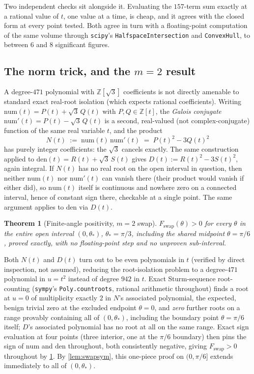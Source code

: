 \documentclass[11pt,reqno]{amsart}
\renewcommand{\_}{\origunderscore\allowbreak}
\numberwithin{equation}{section}
\theoremstyle{plain}
\newtheorem{thm}{Theorem}[section]
\theoremstyle{definition}
\theoremstyle{remark}
\begin{document}
Two independent checks sit alongside it. Evaluating the $157$-term sum
exactly at a rational value of $t$, one value at a time, is cheap, and
it agrees with the closed form at every point tested. Both agree in
turn with a floating-point computation of the same volume through
\texttt{scipy}'s \texttt{HalfspaceIntersection} and \texttt{ConvexHull},
to between $6$ and $8$ significant figures.

\subsection{The norm trick, and the \texorpdfstring{$m=2$}{m=2} result}\label{sec:swap-norm-trick}

A degree-$471$ polynomial with $\mathbb{Z}[\sqrt3]$ coefficients is not
directly amenable to standard exact real-root isolation (which expects
rational coefficients). Writing $\mathrm{num}(t)=P(t)+\sqrt3\,Q(t)$
with $P,Q\in\mathbb{Z}[t]$, the \emph{Galois conjugate}
$\mathrm{num}'(t)=P(t)-\sqrt3\,Q(t)$ is a second,
real-valued (not complex-conjugate) function of the same real variable
$t$, and the product
\[
  N(t) \;:=\; \mathrm{num}(t)\,\mathrm{num}'(t) \;=\; P(t)^2-3Q(t)^2
\]
has purely integer coefficients: the $\sqrt3$ cancels exactly. The same
construction applied to $\mathrm{den}(t)=R(t)+\sqrt3\,S(t)$ gives
$D(t):=R(t)^2-3S(t)^2$, again integral. If $N(t)$ has no real root on
the open interval in question, then neither $\mathrm{num}(t)$ nor
$\mathrm{num}'(t)$ can vanish there (their product would vanish if
either did), so $\mathrm{num}(t)$ itself is continuous and nowhere zero
on a connected interval, hence of constant sign there, checkable at a
single point. The same argument applies to $\mathrm{den}$ via $D(t)$.

\begin{thm}[Finite-angle positivity, $m=2$ swap]\label{thm:swap-m2-new}
$F_{\mathrm{swap}}(\theta)>0$ for every $\theta$ in the entire open
interval $(0,\theta_*)$, $\theta_*=\pi/3$, including the shared
midpoint $\theta=\pi/6$, proved exactly, with no floating-point step
and no unproven sub-interval.
\end{thm}

Both $N(t)$ and $D(t)$ turn out to be even polynomials in $t$ (verified
by direct inspection, not assumed), reducing the root-isolation problem
to a degree-$471$ polynomial in $u=t^2$ instead of degree $942$ in $t$. Exact Sturm-sequence root-counting (\texttt{sympy}'s
\texttt{Poly.count\_roots}, rational arithmetic throughout) finds a
root at $u=0$ of multiplicity exactly $2$ in $N$'s associated
polynomial, the expected, benign trivial zero at the excluded
endpoint $\theta=0$, and \emph{zero} further roots on a range
provably containing all of $(0,\theta_*)$, including the boundary point
$\theta=\pi/6$ itself; $D$'s associated polynomial has no root at all
on the same range. Exact sign evaluation at four points (three interior,
one at the $\pi/6$ boundary) then pins the sign of $\mathrm{num}$ and
$\mathrm{den}$ throughout, both consistently negative, giving
$F_{\mathrm{swap}}>0$ throughout by \cref{thm:swap-m2-new}. By
\cref{lem:swapsym}, this one-piece proof on $(0,\pi/6]$ extends
immediately to all of $(0,\theta_*)$.
\end{document}
